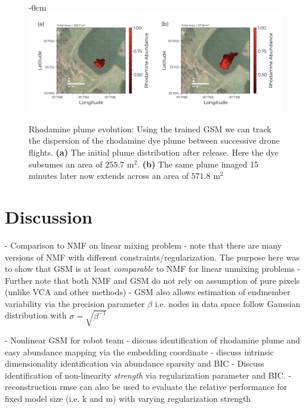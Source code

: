 \documentclass[remotesensing,article,submit,pdftex,moreauthors]{Definitions/mdpi}
\begin{document}
\begin{figure}[H]
\begin{adjustwidth}{-\extralength}{0cm}
\centering
\includegraphics[width=1.25\columnwidth]{results/robot-team/plume-evo.pdf}
\end{adjustwidth}
\caption{Rhodamine plume evolution: Using the trained GSM we can track the dispersion of the rhodamine dye plume between successive drone flights. \textbf{(a)} The initial plume distribution after release. Here the dye subsumes an area of $255.7$ $\text{m}^2$. \textbf{(b)} The same plume imaged 15 minutes later now extends across an area of $571.8$ $\text{m}^2$}
\label{fig:plume-evo}
\end{figure}  


\section{Discussion}

- Comparison to NMF on linear mixing problem
    - note that there are many versions of NMF with different constraints/regularization. The purpose here was to show that GSM is at least \textit{comparable} to NMF for linear unmixing problems
    - Further note that both NMF and GSM do not rely on assumption of pure pixels (unlike VCA and other methods) 
    - GSM also allows estimation of endmember variability via the precision parameter $\beta$ i.e. nodes in data space follow Gaussian distribution with $\sigma = \sqrt{\beta^{-1}}$

- Nonlinear GSM for robot team 
    - discuss identification of rhodamine plume and easy abundance mapping via the embedding coordinate
    - discuss intrinsic dimensionality identification via abundance sparsity and BIC
    - Discuss identification of non-linearity \textit{strength} via regularization parameter and BIC.
    - reconstruction rmse can also be used to evaluate the relative performance for fixed model size (i.e. k and m) with varying regularization strength
\end{document}

